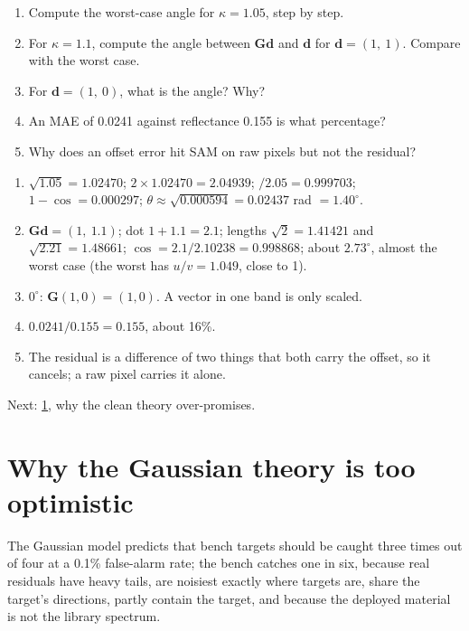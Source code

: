\documentclass[11pt,a4paper,oneside,openany]{book}
\newcommand{\B}[1]{{\symbf{#1}}}
\newcommand{\B}[1]{{\bm{#1}}}
\newcommand{\vd}{\B{d}}
\newcommand{\mG}{\B{G}}
\newcommand{\nextchapter}[1]{\par\medskip\noindent\hfill\textsf{\small Next: #1}\par}
\begin{document}
\begin{checkyourself}
\begin{enumerate}
\item Compute the worst-case angle for $\kappa=1.05$, step by step.
\item For $\kappa=1.1$, compute the angle between $\mG\vd$ and $\vd$ for $\vd=(1,\ 1)$. Compare with the worst case.
\item For $\vd=(1,\ 0)$, what is the angle? Why?
\item An MAE of 0.0241 against reflectance 0.155 is what percentage?
\item Why does an offset error hit SAM on raw pixels but not the residual?
\end{enumerate}
\end{checkyourself}

\begin{answers}
\begin{enumerate}
\item $\sqrt{1.05}=1.02470$; $2\times1.02470=2.04939$; $/2.05=0.999703$; $1-\cos=0.000297$; $\theta\approx\sqrt{0.000594}=0.02437$ rad $=1.40^\circ$.
\item $\mG\vd=(1,\ 1.1)$; dot $1+1.1=2.1$; lengths $\sqrt2=1.41421$ and $\sqrt{2.21}=1.48661$; $\cos=2.1/2.10238=0.998868$; about $2.73^\circ$, almost the worst case
  (the worst has $u/v=1.049$, close to 1).
\item $0^\circ$: $\mG(1,0)=(1,0)$. A vector in one band is only scaled.
\item $0.0241/0.155=0.155$, about 16\%.
\item The residual is a difference of two things that both carry the offset, so it cancels; a raw pixel carries it alone.
\end{enumerate}
\end{answers}

\nextchapter{\cref{ch:optimistic}, why the clean theory over-promises.}

\chapter{Why the Gaussian theory is too optimistic}
\label{ch:optimistic}

\begin{onething}
The Gaussian model predicts that bench targets should be caught three times out of four at a 0.1\% false-alarm rate; the bench catches one in six, because real
residuals have heavy tails, are noisiest exactly where targets are, share the target's directions, partly contain the target, and because the deployed material is
not the library spectrum.
\end{onething}
\end{document}
